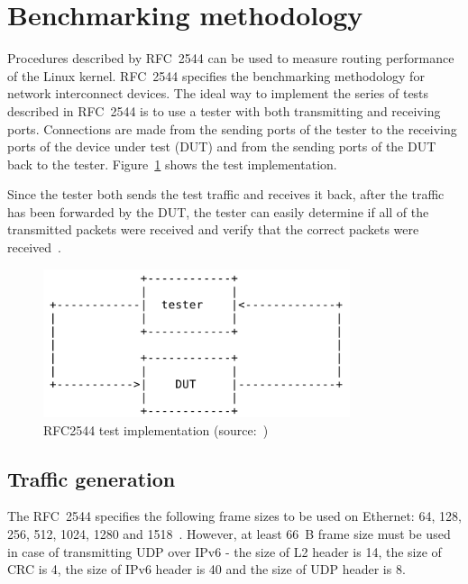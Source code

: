 
\section{Benchmarking methodology}\label{sec:analysis-metodology}
Procedures described by RFC~2544 can be used to measure routing performance of the Linux kernel.
RFC~2544 specifies the benchmarking methodology for network interconnect devices.
The ideal way to implement the series of tests described in RFC~2544 is to use a tester
with both transmitting and receiving ports.
Connections are made from the sending ports of the tester to the receiving ports of the
device under test (DUT) and from the sending ports of the DUT back to the tester.
Figure~\ref{fig:analysis-rfc2544} shows the test implementation.

Since the tester both sends the test traffic and receives
it back, after the traffic has been forwarded by the DUT, the tester
can easily determine if all of the transmitted packets were received
and verify that the correct packets were received~\cite{rfc2544}.
\begin{figure}
	\centering
	\includegraphics[width=9cm,keepaspectratio]{fig/rfc2544.png}
	\caption{RFC2544 test implementation (source:~\cite{rfc2544})}
	\label{fig:analysis-rfc2544}
\end{figure}

\subsection{Traffic generation}
The RFC~2544 specifies the following frame sizes to be used on Ethernet:
64, 128, 256, 512, 1024, 1280 and 1518~\cite{rfc2544}.
However, at least 66~B frame size must be used in case of transmitting UDP over IPv6 - the size of L2 header is 14,
the size of CRC is 4, the size of IPv6 header is 40 and the size of UDP header is 8.

